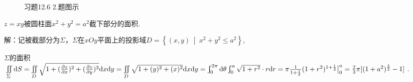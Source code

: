\documentclass[12pt,UTF8]{ctexart}
\newcommand\Set[2]{\left\{#1\ \middle\vert\ #2 \right\}}
\newcommand{\Int}[4]{\varint\nolimits_{#1}^{#2}#3\mathrm d#4}
\newcommand{\varIInt}[4]{\iint\limits_{#1}#2\mathrm d#3\mathrm d#4}
\newcommand{\SIInt}[3]{\iint\limits_{#1}#2\mathrm d#3}
\begin{document}
\begin{enumerate}
\begin{figure}[H]
\begin{center}
\end{center}
\caption{习题12.6 2.题图示}
\label{12-6-2}
\end{figure}

$z=xy$被圆柱面$x^2+y^2=a^2$截下部分的面积.

解：记被截部分为$\Sigma$，$\Sigma$在$xOy$平面上的投影域$D=\Set{(x,y)}{x^2+y^2\leqslant a^2}$,

$\Sigma$的面积$\SIInt\Sigma{}S=\varIInt D{\sqrt{1+(\frac{\partial z}{\partial x})^2+(\frac{\partial z}{\partial y})^2}}xy=\varIInt D{\sqrt{1+(y)^2+(x)^2}}xy\\
=\Int0{2\pi}{}\theta\Int0a{\sqrt{1+r^2}\cdot r}r=\pi\frac{1}{1+\frac12}(1+r^2)^{1+\frac12}\big|_0^a=\frac23\pi[(1+a^2)^{\frac32}-1]$.


\end{enumerate}
\end{document}
